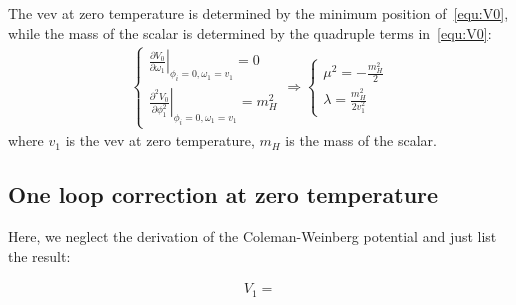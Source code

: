\documentclass[12pt]{article}
\begin{document}
The vev at zero temperature is determined by the minimum position of~\autoref{equ:V0}, while the mass of the scalar is determined by the quadruple terms in~\autoref{equ:V0}:
\begin{align}
    \begin{cases}
    \left.\frac{\partial V_0}{\partial \omega_1}\right|_{\phi_i=0,\omega_1 = v_1} = 0 \\
    \left.\frac{\partial^2 V_0}{\partial \phi_1^2}\right|_{\phi_i=0,\omega_1 = v_1} = m_H^2
    \end{cases} \Rightarrow \begin{cases}
    \mu^2 = -\frac{m_H^2}{2}\\
    \lambda = \frac{m_H^2}{2v_1^2}
    \end{cases}
\end{align}
where $v_1$ is the vev at zero temperature, $m_H$ is the mass of the scalar.

\subsection{One loop correction at zero temperature}

Here, we neglect the derivation of the Coleman-Weinberg potential and just list the result:

\begin{align}
    V_1 =
\end{align}




\end{document}
